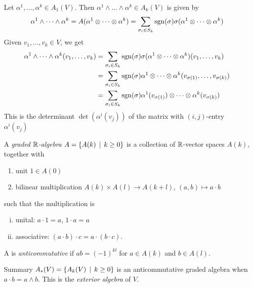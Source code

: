 \begin{frame}
  \begin{example}
    Let $\alpha^1, \dots, \alpha^k \in A_1(V)$.
    Then $\alpha^1 \wedge \dots \wedge \alpha^k \in A_k(V)$ is given by
    \begin{displaymath}
      \alpha^1 \wedge \dots \wedge \alpha^k  = 
      A(\alpha^1 \otimes \dots \otimes \alpha^k )
      =
      \sum_{\sigma_i \in S_k} \operatorname{sgn}(\sigma) \sigma(
      \alpha^1 \otimes \dots \otimes \alpha^k 
      )
    \end{displaymath}
    Given $v_1, \dots, v_k \in V$, we get
    \begin{align*}
      \alpha^1 \wedge \dots \wedge \alpha^k
      (
      v_1,\dots, v_k
      )
      &=
      \sum_{\sigma_i \in S_k} \operatorname{sgn}(\sigma) \sigma(
      \alpha^1 \otimes \dots \otimes \alpha^k 
      )
      (
      v_1,\dots, v_k
      ) 
      \\
      &=
      \sum_{\sigma_i \in S_k} \operatorname{sgn}(\sigma) 
      \alpha^1 \otimes \dots \otimes \alpha^k 
      (
      v_{\sigma(1)},\dots, v_{\sigma(k)}
      ) 
      \\
      &=
      \sum_{\sigma_i \in S_k} \operatorname{sgn}(\sigma) 
      \alpha^1(v_{\sigma(1)})
      \otimes \dots \otimes \alpha^k (v_{\sigma(k)}) \\
    \end{align*}
    This is the determinant $\det(\alpha^i(v_j))$ of the matrix with $(i,j)$-entry
    $\alpha^i(v_j)$
  \end{example}
\end{frame}
\begin{frame}
  \begin{defn}
    A {\em graded $\mathbb R$-algebra} $A = \{A(k) \, \mid \, k \ge 0\}$
    is a collection of $\mathbb R$-vector spaces $A(k)$, together with
    \begin{enumerate}
      \item unit $1 \in A(0)$
      \item bilinear multiplication $A(k) \times A(l) \to A(k+l)$,
        $(a,b) \mapsto a \cdot b$
    \end{enumerate}
    such that the multiplication is
    \begin{enumerate}[(i)]
      \item unital: $a\cdot 1 = a$, $1 \cdot a = a$
      \item associative: $(a \cdot b) \cdot c = a \cdot (b \cdot c)$.
    \end{enumerate}
    A is {\em anticommutative} if $ab = (-1)^{kl}$
    for $a \in A(k)$ and $b \in A(l)$.
  \end{defn}
  \begin{block}
    {Summary}
    $A_*(V) = \{A_k(V) \, \mid \, k \ge 0\}$ is an anticommutative 
    graded algebra when $a \cdot b = a \wedge b$.
    This is the {\em exterior algebra} of $V$.
  \end{block}
\end{frame}
